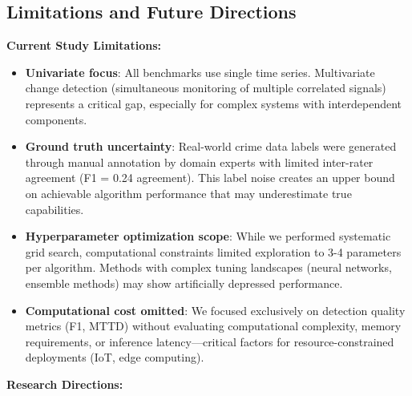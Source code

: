 \subsection{Limitations and Future Directions}

\textbf{Current Study Limitations:}

\begin{itemize}
    \item \textbf{Univariate focus}: All benchmarks use single time series. Multivariate change detection (simultaneous monitoring of multiple correlated signals) represents a critical gap, especially for complex systems with interdependent components.
    
    \item \textbf{Ground truth uncertainty}: Real-world crime data labels were generated through manual annotation by domain experts with limited inter-rater agreement (F1 = 0.24 agreement). This label noise creates an upper bound on achievable algorithm performance that may underestimate true capabilities.
    
    \item \textbf{Hyperparameter optimization scope}: While we performed systematic grid search, computational constraints limited exploration to 3-4 parameters per algorithm. Methods with complex tuning landscapes (neural networks, ensemble methods) may show artificially depressed performance.
    
    \item \textbf{Computational cost omitted}: We focused exclusively on detection quality metrics (F1, MTTD) without evaluating computational complexity, memory requirements, or inference latency—critical factors for resource-constrained deployments (IoT, edge computing).
\end{itemize}

\textbf{Research Directions:}

